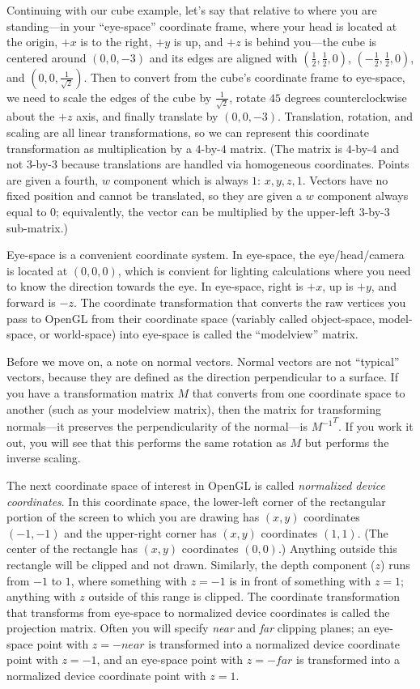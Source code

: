\documentclass{article}
\begin{document}
Continuing with our cube example, let's say that relative to where you are
standing---in your ``eye-space'' coordinate frame, where your head is
located at the origin, $+x$ is to the right, $+y$ is up, and $+z$ is behind
you---the cube is centered around $(0, 0, -3)$ and its edges are aligned
with $(\frac{1}{2},\frac{1}{2},0)$, $(-\frac{1}{2}, \frac{1}{2}, 0)$, and
$(0,0,\frac{1}{\sqrt{2}})$.  Then to convert from the cube's coordinate frame
to eye-space, we need to scale the edges of the cube by $\frac{1}{\sqrt{2}}$,
rotate $45$ degrees counterclockwise about the $+z$ axis,
and finally translate by $(0, 0, -3)$.
Translation, rotation, and scaling are all linear transformations,
so we can represent this coordinate transformation as multiplication
by a $4$-by-$4$ matrix.
(The matrix is $4$-by-$4$ and not $3$-by-$3$ because translations
are handled via homogeneous coordinates.  Points are given
a fourth, $w$ component which is always $1$: $x, y, z, 1$.
Vectors have no fixed position and cannot be translated,
so they are given a $w$ component always equal to $0$;
equivalently, the vector can be multiplied by the upper-left
$3$-by-$3$ sub-matrix.)

Eye-space is a convenient coordinate system.  In eye-space, the eye/head/camera
is located at $(0,0,0)$, which is convient for lighting calculations where you
need to know the direction towards the eye.
In eye-space, right is $+x$, up is $+y$, and forward is $-z$.
The coordinate transformation that converts the raw vertices you pass
to OpenGL from their coordinate space (variably called object-space, model-space,
or world-space) into eye-space is called the ``modelview'' matrix.

Before we move on, a note on normal vectors.
Normal vectors are not ``typical'' vectors,
because they are defined as the direction perpendicular to a surface.
If you have a transformation matrix $M$ that converts from one coordinate
space to another (such as your modelview matrix),
then the matrix for transforming normals---it preserves
the perpendicularity of the normal---is ${M^{-1}}^T$.  If you work it out,
you will see that this performs the same rotation as $M$ but performs
the inverse scaling.

The next coordinate space of interest in OpenGL is called \emph{normalized
device coordinates}.  In this coordinate space, the lower-left corner
of the rectangular portion of the screen to which you are drawing
has $(x,y)$ coordinates $(-1, -1)$ and the upper-right corner has
$(x,y)$ coordinates $(1,1)$.
(The center of the rectangle has $(x,y)$ coordinates $(0,0)$.)
Anything outside this rectangle will be clipped and not drawn.
Similarly, the depth component ($z$) runs from $-1$ to $1$, where
something with $z=-1$ is in front of something with $z=1$; anything
with $z$ outside of this range is clipped.
The coordinate transformation that transforms from eye-space to normalized device
coordinates is called the projection matrix.  Often you will specify \emph{near}
and \emph{far} clipping planes; an eye-space point with $z=-near$ is transformed
into a normalized device coordinate point with $z=-1$,
and an eye-space point with $z=-far$ is transformed
into a normalized device coordinate point with $z=1$.
\end{document}
